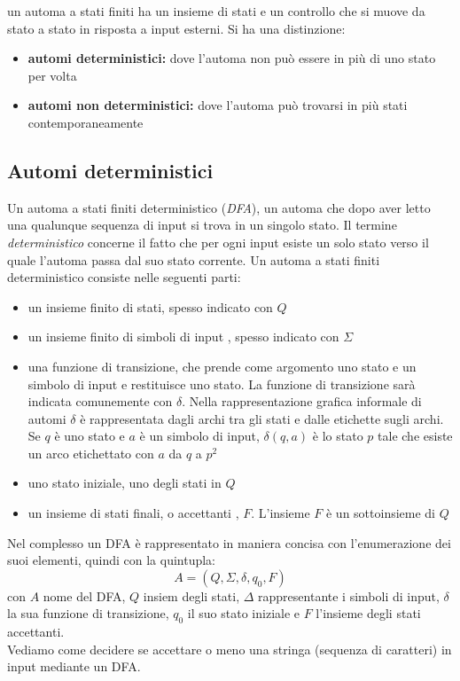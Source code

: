 
un automa a stati finiti ha un insieme di stati e un controllo che si muove da stato a stato in risposta a input esterni. Si ha una distinzione:
\begin{itemize}
\item \textbf{automi deterministici:} dove l'automa non può essere in più di uno stato per volta
\item \textbf{automi non deterministici:} dove l'automa può trovarsi in più stati contemporaneamente
\end{itemize}
\subsection{Automi deterministici}
Un automa a stati finiti deterministico (\textit{DFA}), un automa che dopo aver letto una qualunque sequenza di input si trova in un singolo stato. Il termine \textit{deterministico} concerne il fatto che per ogni input esiste un solo stato verso il quale l'automa passa dal suo stato corrente. Un automa a stati finiti deterministico consiste nelle seguenti parti:
\begin{itemize}
\item un insieme finito di stati, spesso indicato con $Q$
\item un insieme finito di simboli di input , spesso indicato con $\Sigma$
\item una funzione di transizione, che prende come argomento uno stato e un simbolo di input e restituisce uno stato. La funzione di transizione sarà indicata comunemente con $\delta$. Nella rappresentazione grafica informale di automi $\delta$ è rappresentata dagli archi tra gli stati e dalle etichette sugli archi. Se $q$ è uno stato e $a$ è un simbolo di input, $\delta(q,a)$ è lo stato $p$ tale che esiste un arco etichettato con $a$ da $q$ a $p^2$
\item uno stato iniziale, uno degli stati in $Q$
\item un insieme di stati finali, o accettanti , $F$. L'insieme $F$ è un sottoinsieme di $Q$
\end{itemize}
Nel complesso un DFA è rappresentato in maniera concisa con l'enumerazione dei suoi elementi, quindi con la quintupla:
$$A=(Q,\Sigma,\delta,q_0,F)$$
con $A$ nome del DFA, $Q$ insiem degli stati, $\Delta$ rappresentante i simboli di input, $\delta$ la sua funzione di transizione, $q_0$ il suo stato iniziale e $F$ l'insieme degli stati accettanti.\\
Vediamo come decidere se accettare o meno una stringa (sequenza di caratteri) in input mediante un DFA.\\
